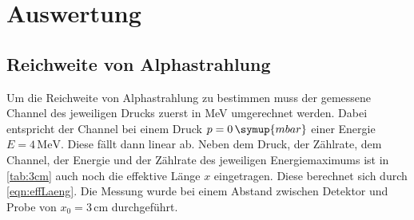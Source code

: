 \section{Auswertung}
\label{sec:Auswertung}



\subsection{Reichweite von Alphastrahlung}

Um die Reichweite von Alphastrahlung zu bestimmen muss der gemessene Channel des jeweiligen Drucks zuerst in MeV umgerechnet werden. Dabei entspricht der
Channel bei einem Druck $p = 0\,\symup{mbar}$ einer Energie $E = 4 \,\unit{\MeV}$. Diese fällt dann linear ab. Neben dem Druck, der Zählrate, dem 
Channel, der Energie und der Zählrate des jeweiligen Energiemaximums ist in \autoref{tab:3cm} auch noch die effektive Länge $x$ eingetragen. Diese
berechnet sich durch \autoref{eqn:effLaeng}. Die Messung wurde bei einem Abstand zwischen Detektor und Probe von $x_0 = 3\,\unit{\cm}$ durchgeführt.

